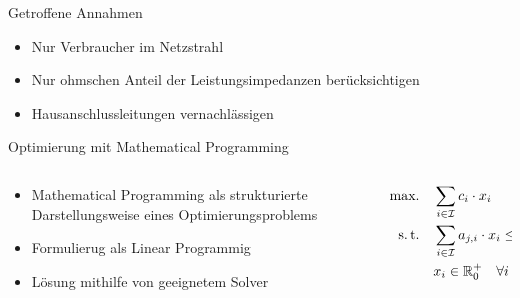 \documentclass[aspectratio=169]{beamer}
\begin{document}
\begin{frame}{Getroffene Annahmen}
	\begin{itemize}
		\item Nur Verbraucher im Netzstrahl
		\item Nur ohmschen Anteil der Leistungsimpedanzen berücksichtigen
		\item Hausanschlussleitungen vernachlässigen
	\end{itemize}
	
\end{frame}


%	
%		


\begin{frame}{Optimierung mit Mathematical Programming}
	\begin{columns}
		\begin{column}{.6\textwidth}
			\begin{itemize}
				\item Mathematical Programming als strukturierte 
				Darstellungsweise eines Optimierungsproblems
				\item Formulierug als Linear Programmig
				\item Lösung mithilfe von geeignetem Solver
			\end{itemize}
		\end{column}
		\begin{column}{.4\textwidth}
			\begin{align*}
				\begin{split}
		\text{max.}\quad&\sum_{i\in\mathcal{I}}c_i\cdot x_i \\
		\text{s.\,t.}\quad&\sum_{i\in\mathcal{I}}a_{j,i}\cdot x_i\leq b_j\quad
		\forall j\in\mathcal{J} \\
		& x_i\in\mathbb{R}_0^+\quad\forall i\in\mathcal{I}
				\end{split}
			\end{align*}
		\end{column}
	\end{columns}
\end{frame}
\end{document}
